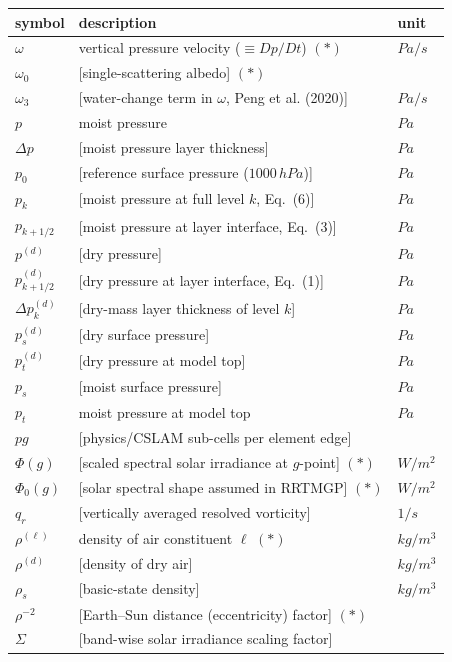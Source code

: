 \documentclass[draft]{agujournal2019}
\begin{document}
 \begin{tabular}{l l l}
  \hline
 symbol & description & unit \\
 \hline  \hline
  $\omega$ & vertical pressure velocity ($\equiv Dp/Dt$) $(*)$ & $Pa/s$\\
  $\omega_0$ & [single-scattering albedo] $(*)$ & \\
  $\omega_3$ & [water-change term in $\omega$, Peng et al. (2020)] & $Pa/s$\\
  $p$ & moist pressure & $Pa$\\
  $\Delta p$ & [moist pressure layer thickness] & $Pa$\\
  $p_0$ & [reference surface pressure ($1000\,hPa$)] & $Pa$\\
  $p_k$ & [moist pressure at full level $k$, Eq.~(6)] & $Pa$\\
  $p_{k+1/2}$ & [moist pressure at layer interface, Eq.~(3)] & $Pa$\\
  $p^{(d)}$ & [dry pressure] & $Pa$\\
  $p^{(d)}_{k+1/2}$ & [dry pressure at layer interface, Eq.~(1)] & $Pa$\\
  $\Delta p^{(d)}_k$ & [dry-mass layer thickness of level $k$] & $Pa$\\
  $p^{(d)}_s$ & [dry surface pressure] & $Pa$\\
  $p^{(d)}_t$ & [dry pressure at model top] & $Pa$\\
  $p_s$ & [moist surface pressure] & $Pa$\\
  $p_t$ & moist pressure at model top & $Pa$\\
  $pg$ & [physics/CSLAM sub-cells per element edge] & \\
  $\Phi(g)$ & [scaled spectral solar irradiance at $g$-point] $(*)$ & $W/m^2$\\
  $\Phi_0(g)$ & [solar spectral shape assumed in RRTMGP] $(*)$ & $W/m^2$\\
  $q_r$ & [vertically averaged resolved vorticity] & $1/s$\\
  $\rho^{(\ell)}$ & density of air constituent $\ell$ $(*)$ & $kg/m^3$\\
  $\rho^{(d)}$ & [density of dry air] & $kg/m^3$\\
  $\rho_s$ & [basic-state density] & $kg/m^3$\\
  $\rho^{-2}$ & [Earth--Sun distance (eccentricity) factor] $(*)$ & \\
  $\Sigma$ & [band-wise solar irradiance scaling factor] & \\
 \hline
 \hline
 \end{tabular}
\end{document}
